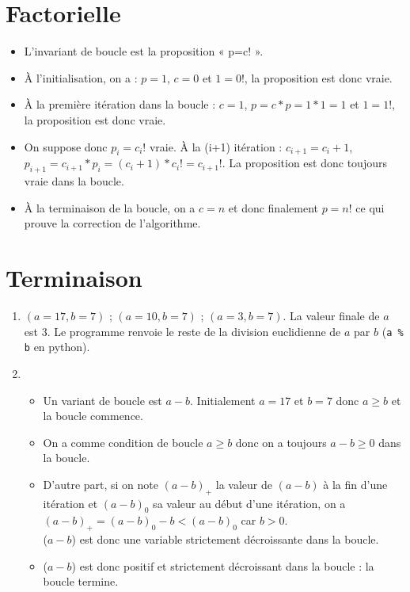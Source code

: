 \section{Factorielle}

\begin{itemize}
\item L'invariant de boucle est la proposition « p=c! ».

\item À l'initialisation, on a : $p=1$, $c=0$ et $1=0!$, la proposition est donc vraie.

\item À la première itération dans la boucle : $c=1$, $p=c*p=1*1=1$ et $1=1!$, la proposition est donc vraie.

\item On suppose donc $p_i=c_i!$ vraie. À la (i+1) itération : $c_{i+1}=c_i+1$, $p_{i+1} = c_{i+1}*p_i=(c_i+1)*c_i!=c_{i+1}!$. La proposition est donc toujours vraie dans la boucle.

\item À la terminaison de la boucle, on a $c=n$ et donc finalement $p=n!$ ce qui prouve la correction de l'algorithme.
\end{itemize}

\section{Terminaison}

\begin{enumerate}

\item $(a=17,b=7)$ ; $(a=10,b=7)$ ; $(a=3,b=7)$. La valeur finale de $a$ est 3. Le programme renvoie le reste de la division euclidienne de $a$ par $b$ (\texttt{a \% b} en python).

\item 
\begin{itemize}
\item Un variant de boucle est $a-b$. Initialement $a=17$ et $b=7$ donc $a\geq b$ et la boucle commence.

\item On a comme condition de boucle $a \geq b$ donc on a toujours $a-b \geq0$ dans la boucle.

\item D'autre part, si on note $(a-b)_+$ la valeur de $(a-b)$ à la fin d'une itération et $(a-b)_0$ sa valeur au début d'une itération, on a $(a-b)_+ = (a-b)_0 - b < (a-b)_0$ car $b>0$.\\($a-b$) est donc une variable strictement décroissante dans la boucle.

\item ($a-b$) est donc positif et strictement décroissant dans la boucle : la boucle termine.

\end{itemize}

\end{enumerate}

